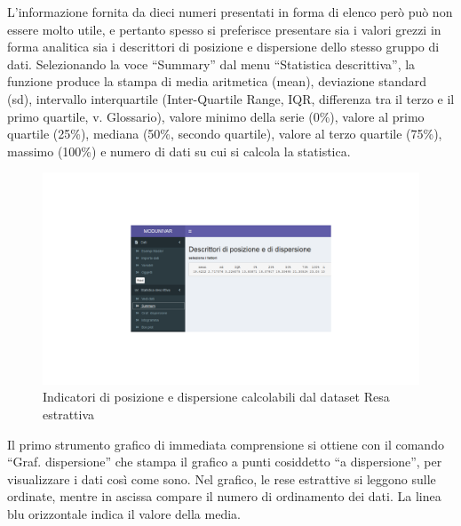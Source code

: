 \documentclass[
  11pt,
]{book}
\begin{document}
L'informazione fornita da dieci numeri presentati in forma di elenco però può non essere molto utile, e pertanto spesso si preferisce presentare sia i valori grezzi in forma analitica sia i descrittori di posizione e dispersione dello stesso gruppo di dati. Selezionando la voce ``Summary'' dal menu ``Statistica descrittiva'', la funzione produce la stampa di media aritmetica (mean), deviazione standard (sd), intervallo interquartile (Inter-Quartile Range, IQR, differenza tra il terzo e il primo quartile, v. Glossario), valore minimo della serie (0\%), valore al primo quartile (25\%), mediana (50\%, secondo quartile), valore al terzo quartile (75\%), massimo (100\%) e numero di dati su cui si calcola la statistica.

\begin{figure}

{\centering \includegraphics[width=1\linewidth]{Immagini/Descrittiva/3_SummaryResa_estrattiva} 

}

\caption{Indicatori di posizione e dispersione calcolabili dal dataset Resa estrattiva}\label{fig:sd3}
\end{figure}

Il primo strumento grafico di immediata comprensione si ottiene con il comando ``Graf. dispersione'' che stampa il grafico a punti cosiddetto ``a dispersione'', per visualizzare i dati così come sono.
Nel grafico, le rese estrattive si leggono sulle ordinate, mentre in ascissa compare il numero di ordinamento dei dati. La linea blu orizzontale indica il valore della media.
\end{document}
